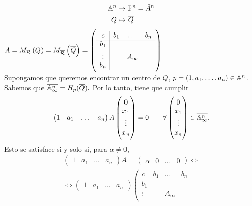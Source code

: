  \begin{obs}
     \begin{align*}
         \mathbb{A}^n &\to \mathbb{P}^n = \bar{A}^n \\
         Q &\mapsto \overline{Q}
     \end{align*}
     $A = M_{\mathcal{R}} \left( Q \right) = M_{\overline{\mathcal{R}}} \left( \overline{Q} \right) =
     \left(\begin{array}{c|ccc}
         c & b_1 & \dots & b_n \\
         \hline
         b_1 & & & \\
         \vdots & & A_\infty & \\
         b_n & & &
    \end{array}\right)$ \\
    Supongamos que queremos encontrar un centro de $Q$, $p = 
    \left( 1, a_1, \dots, a_n \right)\in \mathbb{A}^n$. Sabemos que $\overline{\mathbb{A}^n_\infty} = 
    H_p(\overline{Q}).$ Por lo tanto, tiene que cumplir
\[\begin{pmatrix}
 1 & a_1 & \dots & a_n 
\end{pmatrix}
A
\begin{pmatrix}
 0 \\ x_1 \\ \vdots \\ x_n 
\end{pmatrix}
= 0 \qquad \forall
\begin{pmatrix} 0 \\ x_1 \\ \vdots \\ x_n \end{pmatrix} \in \overline{\mathbb{A}^n_\infty}.
\]
Esto se satisface si y solo si, para $\alpha \neq 0$,
\begin{gather*}
  \begin{pmatrix}
 1 & a_1 & \dots & a_n 
\end{pmatrix}
A = 
\begin{pmatrix} 
  \alpha & 0 & \dots & 0 
\end{pmatrix} 
\iff \\
\iff
 \begin{pmatrix}
 1 & a_1 & \dots & a_n 
\end{pmatrix}
\left(\begin{array}{c|ccc}
         c & b_1 & \dots & b_n \\
         \hline
         b_1 & & & \\
         \vdots & & A_\infty & \\

\end{array}
\end{gather*}
\end{obs}
